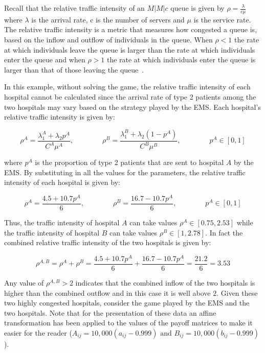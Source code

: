 Recall that the relative traffic intensity of an \(M|M|c\) queue is given by
\(\rho = \frac{\lambda}{c \mu}\) where \(\lambda\) is the arrival rate, c is
the number of servers and \(\mu\) is the service rate.
The relative traffic intensity is a metric that measures how congested a queue
is, based on the inflow and outflow of individuals in the queue.
When \(\rho < 1\) the rate at which individuals leave the queue is larger than
the rate at which individuals enter
the queue and when \(\rho > 1\) the rate at which individuals enter the queue is
larger than that of those leaving the queue~\cite{almeida2018note}.

In this example, without solving the game, the relative traffic intensity of
each hospital cannot be calculated since the arrival rate of type 2 patients
among the two hospitals may vary based on the strategy played by the EMS.
Each hospital's relative traffic intensity is given by:

\begin{equation}
    \rho^A = \frac{\lambda_1^A + \lambda_2 p^A}{C^A \mu^A}, \qquad \qquad
    \rho^B = \frac{\lambda_1^B + \lambda_2 (1 - p^A)}{C^B \mu^B}, \qquad \qquad
    p^A \in [0, 1]
\end{equation}

where \(p^A\) is the proportion of type 2 patients that are sent to hospital
\(A\) by the EMS.
By substituting in all the values for the parameters, the relative traffic
intensity of each hospital is given by:

\begin{equation}
    \rho^A = \frac{4.5 + 10.7 p^A}{6}, \qquad \qquad
    \rho^B = \frac{16.7 - 10.7 p^A}{6}, \qquad \qquad
    p^A \in [0, 1]
\end{equation}

Thus, the traffic intensity of hospital \(A\) can take values \(\rho^A \in
[0.75, 2.53]\) while the traffic intensity of hospital \(B\) can take values
\(\rho^B \in [1, 2.78]\).
In fact the combined relative traffic intensity of the two hospitals is given
by:

\begin{equation}
    \rho^{A, B} = \rho^A + \rho^B = \frac{4.5 + 10.7 p^A}{6} +
    \frac{16.7 - 10.7 p^A}{6} = \frac{21.2}{6} = 3.53
\end{equation}

Any value of \(\rho^{A, B} > 2\) indicates that the combined inflow of the
two hospitals is higher than the combined outflow and in this case it is well
above \(2\).
Given these two highly congested hospitals, consider the game played by the
EMS and the two hospitals.
Note that for the presentation of these data an affine transformation has been
applied to the values of the payoff matrices to make it easier for the reader
(\(A_{ij} = 10,000 (a_{ij} - 0.999) \text{ and }
B_{ij} = 10,000 (b_{ij} - 0.999)\)).

